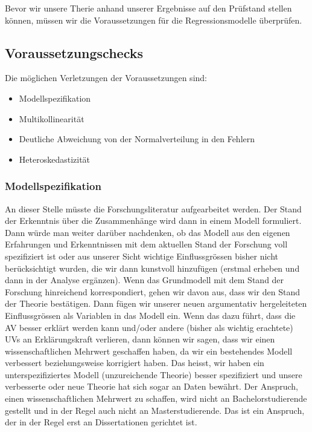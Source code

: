 \documentclass[
  10pt,
  letterpaper,
  a4paper, twoside]{scrreprt}
\providecommand{\tightlist}{%
  \setlength{\itemsep}{0pt}\setlength{\parskip}{0pt}}\usepackage{longtable,booktabs,array}
\begin{document}
Bevor wir unsere Therie anhand unserer Ergebnisse auf den Prüfstand
stellen können, müssen wir die Voraussetzungen für die
Regressionsmodelle überprüfen.

\subsection{Voraussetzungschecks}\label{voraussetzungschecks}

Die möglichen Verletzungen der Voraussetzungen sind:

\begin{itemize}
\tightlist
\item
  Modellspezifikation
\item
  Multikollinearität
\item
  Deutliche Abweichung von der Normalverteilung in den Fehlern
\item
  Heteroskedastizität
\end{itemize}

\subsubsection{Modellspezifikation}\label{modellspezifikation}

An dieser Stelle müsste die Forschungsliteratur aufgearbeitet werden.
Der Stand der Erkenntnis über die Zusammenhänge wird dann in einem
Modell formuliert. Dann würde man weiter darüber nachdenken, ob das
Modell aus den eigenen Erfahrungen und Erkenntnissen mit dem aktuellen
Stand der Forschung voll spezifiziert ist oder aus unserer Sicht
wichtige Einflussgrössen bisher nicht berücksichtigt wurden, die wir
dann kunstvoll hinzufügen (erstmal erheben und dann in der Analyse
ergänzen). Wenn das Grundmodell mit dem Stand der Forschung hinreichend
korrespondiert, gehen wir davon aus, dass wir den Stand der Theorie
bestätigen. Dann fügen wir unserer neuen argumentativ hergeleiteten
Einflussgrössen als Variablen in das Modell ein. Wenn das dazu führt,
dass die AV besser erklärt werden kann und/oder andere (bisher als
wichtig erachtete) UVs an Erklärungskraft verlieren, dann können wir
sagen, dass wir einen wissenschaftlichen Mehrwert geschaffen haben, da
wir ein bestehendes Modell verbessert beziehungsweise korrigiert haben.
Das heisst, wir haben ein unterspezifiziertes Modell (unzureichende
Theorie) besser spezifiziert und unsere verbesserte oder neue Theorie
hat sich sogar an Daten bewährt. Der Anspruch, einen wissenschaftlichen
Mehrwert zu schaffen, wird nicht an Bachelorstudierende gestellt und in
der Regel auch nicht an Masterstudierende. Das ist ein Anspruch, der in
der Regel erst an Dissertationen gerichtet ist.
\end{document}
